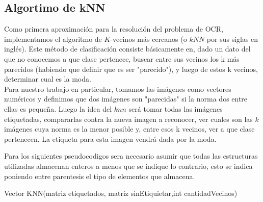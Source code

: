 \subsection{Algortimo de kNN}
Como primera aproximación para la resolución del problema de OCR, implementamos el algoritmo de $K$-vecinos más cercanos (o $kNN$ por sus siglas en inglés). Este método de clasificación consiste básicamente en, dado un dato del que no conocemos a que clase pertenece, buscar entre sus vecinos los k más parecidos (habiendo que definir que es ser "parecido"), y luego de estos k vecinos, determinar cual es la moda. 
\\
Para nuestro trabajo en particular, tomamos las imágenes como vectores numéricos y definimos que dos imágenes son "parecidas" si la norma dos entre ellas es pequeña. Luego la idea del $knn$ será tomar todas las imágenes etiquetadas, compararlas contra la nueva imagen a reconocer, ver cuales son las $k$ imágenes cuya norma es la menor posible y, entre esos k vecinos, ver a que clase pertenecen. La etiqueta para esta imagen vendrá dada por la moda. 

Para los siguientes pseudocodigos sera necesario asumir que todas las estructuras utilizadas almacenan enteros a menos que se indique lo contrario, esto se indica poniendo entre parentesis el tipo de elementos que almacena.
\\
\begin{algorithm}
\begin{algorithmic}[1]\parskip=1mm
\caption{Vector KNN(matriz etiquetados, matriz sinEtiquietar,int cantidadVecinos)}
\ENDFOR
{}
\end{algorithmic}
\end{algorithm}

